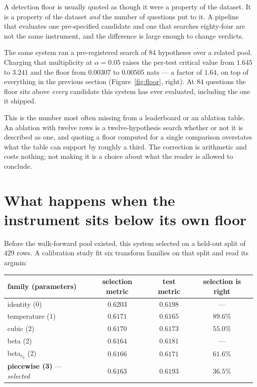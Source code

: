 \documentclass{article}
\begin{document}
A detection floor is usually quoted as though it were a property of the dataset. It is a property of the dataset \emph{and} the number of questions put to it. A pipeline that evaluates one pre-specified candidate and one that searches eighty-four are not the same instrument, and the difference is large enough to change verdicts.

The same system ran a pre-registered search of $84$ hypotheses over a related pool. Charging that multiplicity at $\alpha=0.05$ raises the per-test critical value from $1.645$ to $3.241$ and the floor from $0.00307$ to $0.00505$ nats --- a factor of $1.64$, on top of everything in the previous section (Figure~\ref{fig:floor}, right). At $84$ questions the floor sits above \emph{every} candidate this system has ever evaluated, including the one it shipped.

This is the number most often missing from a leaderboard or an ablation table. An ablation with twelve rows is a twelve-hypothesis search whether or not it is described as one, and quoting a floor computed for a single comparison overstates what the table can support by roughly a third. The correction is arithmetic and costs nothing; not making it is a choice about what the reader is allowed to conclude.

\section{What happens when the instrument sits below its own floor}

Before the walk-forward pool existed, this system selected on a held-out split of $429$ rows. A calibration study fit six transform families on that split and read its argmin:

\begin{center}\small
\begin{tabular}{lccc}
\toprule
family (parameters) & selection metric & test metric & selection is right \\
\midrule
identity (0) & $0.6203$ & $0.6198$ & --- \\
temperature (1) & $0.6171$ & $\mathbf{0.6165}$ & $89.6\%$ \\
cubic (2) & $0.6170$ & $0.6173$ & $55.0\%$ \\
beta (2) & $0.6164$ & $0.6181$ & --- \\
beta$_{c_0}$ (2) & $0.6166$ & $0.6171$ & $61.6\%$ \\
\textbf{piecewise (3)} --- \emph{selected} & $\mathbf{0.6163}$ & $0.6193$ & $36.5\%$ \\
\bottomrule
\end{tabular}
\end{center}
\end{document}
